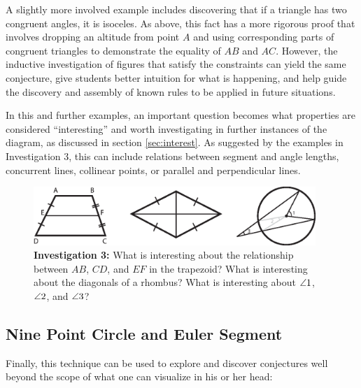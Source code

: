 A slightly more involved example includes discovering that if a
triangle has two congruent angles, it is isoceles.  As above, this
fact has a more rigorous proof that involves dropping an altitude from
point $A$ and using corresponding parts of congruent triangles to
demonstrate the equality of $AB$ and $AC$.  However, the inductive
investigation of figures that satisfy the constraints can yield the
same conjecture, give students better intuition for what is happening,
and help guide the discovery and assembly of known rules to be applied
in future situations.

In this and further examples, an important question becomes what
properties are considered ``interesting'' and worth investigating in
further instances of the diagram, as discussed in section
\ref{sec:interest}.  As suggested by the examples in Investigation 3,
this can include relations between segment and angle lengths,
concurrent lines, collinear points, or parallel and perpendicular
lines.

\begin{figure}[h!]
\centering
\includegraphics[width=0.95\textwidth]{diagrams/extra-diagrams.eps}
\captionsetup{labelformat=empty}
\caption{{\bf Investigation 3:} What is interesting about the
  relationship between $AB$, $CD$, and $EF$ in the trapezoid? What is
  interesting about the diagonals of a rhombus? What is interesting
  about $\protect\angle 1$, $\protect\angle 2$, and $\protect\angle 3$?}
\end{figure}

\subsection{Nine Point Circle and Euler Segment}

Finally, this technique can be used to explore and discover
conjectures well beyond the scope of what one can visualize in his or
her head:

